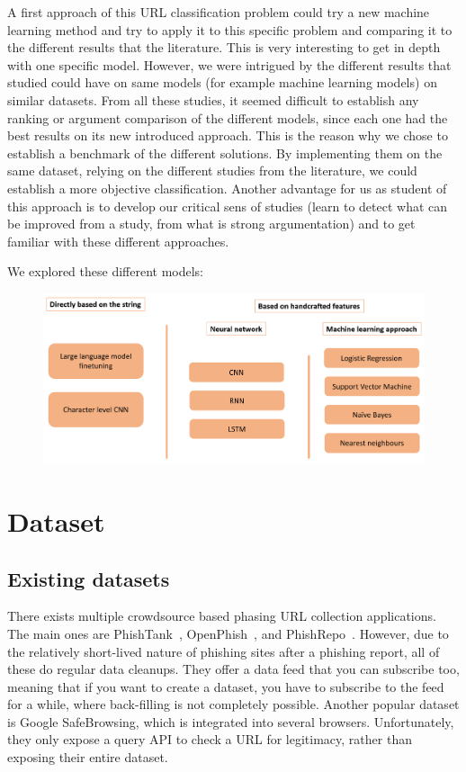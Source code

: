 \documentclass{article}
\begin{document}
    A first approach of this URL classification problem could try a new machine learning method and try to apply it to this specific problem and comparing it to the different results that the literature.
    This is very interesting to get in depth with one specific model.
    However, we were intrigued by the different results that studied could have on same models (for example machine learning models) on similar datasets.
    From all these studies, it seemed difficult to establish any ranking or argument comparison of the different models, since each one had the best results on its new introduced approach.
    This is the reason why we chose to establish a benchmark of the different solutions.
    By implementing them on the same dataset, relying on the different studies from the literature, we could establish a more objective classification.
    Another advantage for us as student of this approach is to develop our critical sens of studies (learn to detect what can be improved from a study, from what is strong argumentation) and to get familiar with these different approaches.

    We explored these different models:
    \begin{figure}[H]
        \centering
        \includegraphics[width=\linewidth]{report_img/modelspresentation}
        \caption{}
        \label{fig:model_presentation}
    \end{figure}


    \section{Dataset}\label{sec:dataset}

    \subsection{Existing datasets}\label{subsec:datasets}

    There exists multiple crowdsource based phasing URL collection applications.
    The main ones are PhishTank~\cite{PhishTank}, OpenPhish~\cite{OpenPhish}, and PhishRepo~\cite{PhishRepo}.
    However, due to the relatively short-lived nature of phishing sites after a phishing report, all of these do regular data cleanups.
    They offer a data feed that you can subscribe too, meaning that if you want to create a dataset, you have to subscribe to the feed for a while, where back-filling is not completely possible.
    Another popular dataset is Google SafeBrowsing\cite{GoogleSafeBrowsing}, which is integrated into several browsers.
    Unfortunately, they only expose a query API to check a URL for legitimacy, rather than exposing their entire dataset.
\end{document}
